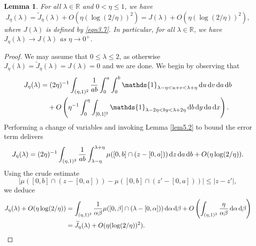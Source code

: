 \documentclass[12pt,reqno]{amsart}
\newtheorem{lemma}[theorem]{Lemma}
\theoremstyle{definition}
\theoremstyle{remark}
\numberwithin{equation}{section}
\def \R {\mathbb{R}}
\def\d{{\,{\rm d}}}
\newcommand\1{\mathds{1}}
\begin{document}
\begin{lemma} \label{lem5.3}
    For all $\lambda\in\R$ and $0<\eta\leqslant 1$, we have
    \begin{equation*}
        J_\eta(\lambda) = \widetilde{J}_\eta(\lambda) + O(\eta(\log(2/\eta))^2)= J(\lambda) + O(\eta(\log(2/\eta))^2),
    \end{equation*}
    where $J(\lambda)$ is defined by \eqref{eqn3.7}.
    In particular, for all $\lambda\in\R$, we have $J_\eta(\lambda)\to J(\lambda)$ as $\eta\to 0^+$.
    \end{lemma}

    \begin{proof}
    We may assume that $0\leqslant\lambda\leqslant 2$, as otherwise $J_\eta(\lambda)=\widetilde J_\eta(\lambda) = J(\lambda)=0$ and we are done. 
    We begin by observing that
\begin{align*}
  J_{\eta}(\lambda) = &\; (2\eta)^{-1} \int_{(\eta,1)^2} \frac{1}{ab} \int_{0}^a\int_0^b \1_{\lambda - \eta < u + v < \lambda + \eta}\d u\d v\d a \d b  \\
  &+ O\left( \eta^{-1} \int_{0}^{\eta} \int_{[0,1]^2} \1_{ \lambda - 2\eta < by < \lambda + 2 \eta}\d b\d y\d a \d x\right).
\end{align*}
Performing a change of variables and invoking Lemma \ref{lem5.2} to bound the error term delivers
\begin{equation*}
    J_\eta(\lambda)= (2\eta)^{-1}\int_{(\eta,1)^2} \frac{1}{ab} \int_{\lambda-\eta}^{\lambda + \eta}  \mu( [0,b] \cap ( z- [0,a]) )\d z \d a \d b+ O(\eta\log(2/\eta)).
\end{equation*}
Using the crude estimate
\begin{equation}\label{eqn5.3}
    |\mu( [0,b] \cap ( z- [0,a]) )-\mu( [0,b] \cap ( z'- [0,a]) )|\leqslant|z-z'|,
\end{equation}
we deduce
\begin{align*}
    J_\eta(\lambda)+O(\eta\log(2/\eta)) &= \int_{(\eta,1)^2} \frac{1}{\alpha\beta} \mu( [0,\beta] \cap ( \lambda- [0,\alpha]) )\d\alpha \d\beta + O\left(\int_{(\eta,1)^2} \frac{\eta}{\alpha\beta}\d\alpha \d\beta\right)\\
    &= \widetilde{J}_\eta(\lambda) + O(\eta(\log(2/\eta))^2).
\end{align*}


\end{proof}
\end{document}
